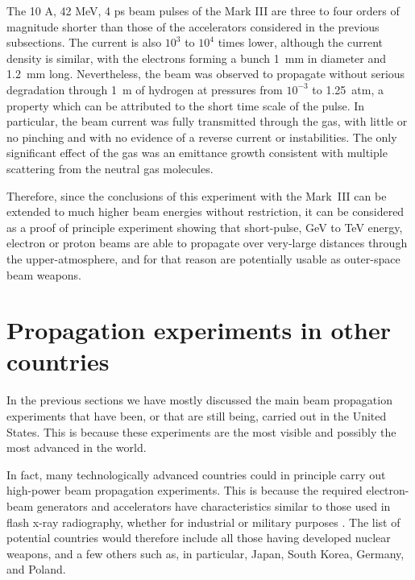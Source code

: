 \documentclass [12pt,a4paper,     ]{report} %
\begin{document}
The 10 A, 42 MeV, 4 ps beam pulses of the Mark III are three to four orders of magnitude shorter than those of the accelerators considered in the previous subsections.  The current is also $10^3$ to $10^4$ times lower, although the current density is similar, with the electrons forming a bunch 1~mm in diameter and 1.2~mm long.  Nevertheless, the beam was observed to propagate without serious degradation through 1~m of hydrogen at pressures from $10^{-3}$ to 1.25~atm, a property which can be attributed to the short time scale of the pulse.  In particular, the beam current was fully transmitted through the gas, with little or no pinching and with no evidence of a reverse current or instabilities.  The only significant effect of the gas was an emittance growth consistent with multiple scattering from the neutral gas molecules.

Therefore, since the conclusions of this experiment with the Mark~III can be extended to much higher beam energies without restriction, it  can be considered as a proof of principle experiment showing that short-pulse, GeV to TeV energy, electron or proton beams are able to propagate over very-large distances through the upper-atmosphere, and for that reason are potentially usable as outer-space beam weapons.








\section{Propagation experiments in other countries}
\label{oth:0}

In the previous sections we have mostly discussed the main beam propagation experiments that have been, or that are still being, carried out in the United States.  This is because these experiments are the most visible and possibly the most advanced in the world.  

    In fact, many technologically advanced countries could in principle carry out high-power beam propagation experiments.  This is because the required electron-beam generators and accelerators have characteristics similar to those used in flash x-ray radiography, whether for industrial or military purposes \cite{HUGHE2001-}.  The list of potential countries would therefore include all those having developed nuclear weapons, and a few others such as, in particular, Japan, South Korea, Germany, and Poland.
\end{document}
